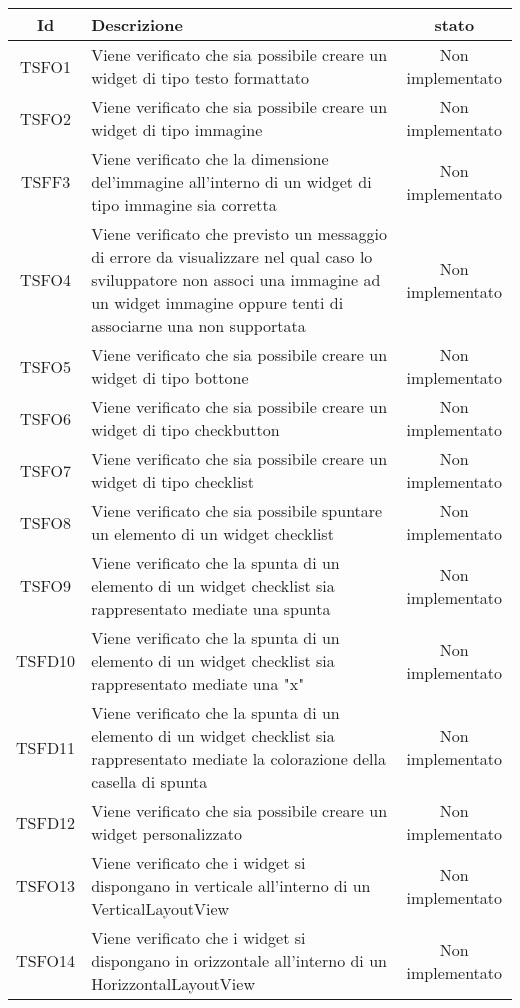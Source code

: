 \begin{center}
	\begin{longtable}{|c|>{\centering}m{10cm}|c|}\hline
		Id & Descrizione & stato \\ \hline
		TSFO1 & Viene verificato che sia possibile creare un widget di tipo testo formattato & Non implementato \\ \hline
		TSFO2 & Viene verificato che sia possibile creare un widget di tipo immagine & Non implementato \\ \hline
		TSFF3 & Viene verificato che la dimensione del'immagine all'interno di un widget di tipo immagine sia corretta & Non implementato \\ \hline
		TSFO4 & Viene verificato che previsto un messaggio di errore da visualizzare nel qual caso lo sviluppatore non associ una immagine ad un widget immagine oppure tenti di associarne una non supportata & Non implementato \\ \hline
		TSFO5 & Viene verificato che sia possibile creare un widget di tipo bottone & Non implementato \\ \hline
		TSFO6 & Viene verificato che sia possibile creare un widget di tipo checkbutton & Non implementato \\ \hline
		TSFO7 & Viene verificato che sia possibile creare un widget di tipo checklist & Non implementato \\ \hline
		TSFO8 & Viene verificato che sia possibile spuntare un elemento di un widget checklist & Non implementato \\ \hline
		TSFO9 & Viene verificato che la spunta di un elemento di un widget checklist sia rappresentato mediate una spunta & Non implementato \\ \hline
		TSFD10 & Viene verificato che la spunta di un elemento di un widget checklist sia rappresentato mediate una "x" & Non implementato \\ \hline
		TSFD11 & Viene verificato che la spunta di un elemento di un widget checklist sia rappresentato mediate la colorazione della casella di spunta & Non implementato \\ \hline
		TSFD12 & Viene verificato che sia possibile creare un widget personalizzato & Non implementato \\ \hline
		TSFO13 & Viene verificato che i widget si dispongano in verticale all'interno di un VerticalLayoutView & Non implementato \\ \hline
		TSFO14 & Viene verificato che i widget si dispongano in orizzontale all'interno di un HorizzontalLayoutView & Non implementato \\ \hline

\end{longtable}
\end{center}
